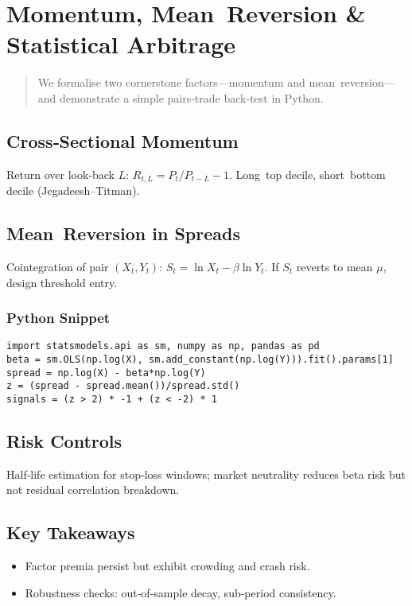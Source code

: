 \chapter{Momentum, Mean Reversion \& Statistical Arbitrage}\label{ch:mommean}

\begin{abstract}
We formalise two cornerstone factors—momentum and mean reversion—and
demonstrate a simple pairs‐trade back‑test in Python.
\end{abstract}

\section{Cross‑Sectional Momentum}

Return over look‑back \(L\): \(R_{t,L} = P_t/P_{t-L}-1\).  
Long top decile, short bottom decile (Jegadeesh–Titman).

\section{Mean Reversion in Spreads}

Cointegration of pair \((X_t,Y_t)\):
\(S_t = \ln X_t - \beta\ln Y_t\).  
If \(S_t\) reverts to mean \(\mu\), design threshold entry.

\subsection*{Python Snippet}

\begin{verbatim}
import statsmodels.api as sm, numpy as np, pandas as pd
beta = sm.OLS(np.log(X), sm.add_constant(np.log(Y))).fit().params[1]
spread = np.log(X) - beta*np.log(Y)
z = (spread - spread.mean())/spread.std()
signals = (z > 2) * -1 + (z < -2) * 1
\end{verbatim}

\section{Risk Controls}

Half‑life estimation for stop‐loss windows; market neutrality reduces
beta risk but not residual correlation breakdown.

\section*{Key Takeaways}

\begin{itemize}
  \item Factor premia persist but exhibit crowding and crash risk.
  \item Robustness checks: out‑of‑sample decay, sub‐period consistency.
\end{itemize}
